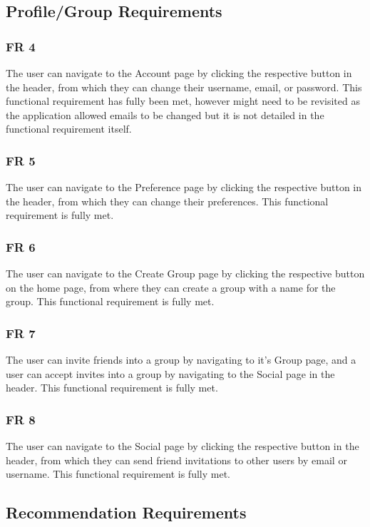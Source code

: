 \documentclass[12pt, titlepage]{article}
\begin{document}
\subsection{Profile/Group Requirements}
\subsubsection{FR 4}
The user can navigate to the Account page by clicking the respective button in the header, from which they can change their username, email, or password. This functional requirement has fully been met, however might need to be revisited as the application allowed emails to be changed but it is not detailed in the functional requirement itself.

\subsubsection{FR 5}
The user can navigate to the Preference page by clicking the respective button in the header, from which they can change their preferences. This functional requirement is fully met.

\subsubsection{FR 6}
The user can navigate to the Create Group page by clicking the respective button on the home page, from where they can create a group with a name for the group. This functional requirement is fully met.

\subsubsection{FR 7}
The user can invite friends into a group by navigating to it's Group page, and a user can accept invites into a group by navigating to the Social page in the header. This functional requirement is fully met.

\subsubsection{FR 8}
The user can navigate to the Social page by clicking the respective button in the header, from which they can send friend invitations to other users by email or username. This functional requirement is fully met.

\subsection{Recommendation Requirements}
\end{document}

